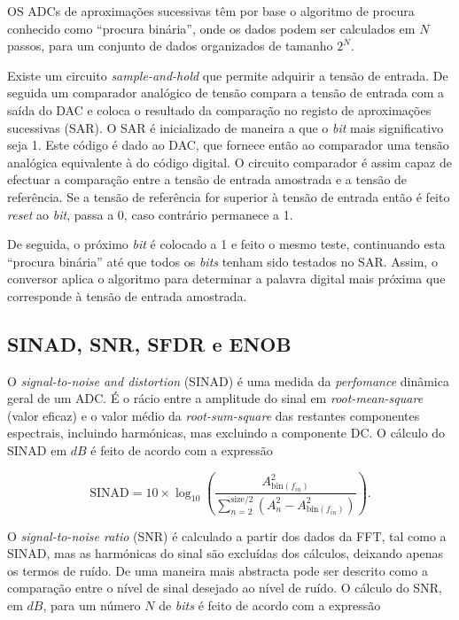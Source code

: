 \documentclass[11pt]{article}
\numberwithin{equation}{section}
\begin{document}
OS ADCs de aproximações sucessivas têm por base o algoritmo de procura conhecido como ``procura binária'', onde os dados podem ser calculados em $N$ passos, para um conjunto de dados organizados de tamanho $2^N$.

Existe um circuito \textit{sample-and-hold} que permite adquirir a tensão de entrada. De seguida um comparador analógico de tensão compara a tensão de entrada com a saída do DAC e coloca o resultado da comparação no registo de aproximações sucessivas (SAR). O SAR é inicializado de maneira a que o \textit{bit} mais significativo seja 1. Este código é dado ao DAC, que fornece então ao comparador uma tensão analógica equivalente à do código digital. O circuito comparador é assim capaz de efectuar a comparação entre a tensão de entrada amostrada e a tensão de referência. Se a tensão de referência for superior à tensão de entrada então é feito \textit{reset} ao \textit{bit}, passa a 0, caso contrário permanece a 1. 

De seguida, o próximo \textit{bit} é colocado a 1 e feito o mesmo teste, continuando esta ``procura binária'' até que todos os \textit{bits} tenham sido testados no SAR. Assim, o conversor aplica o algoritmo para determinar a palavra digital mais próxima que corresponde à tensão de entrada amostrada.

\subsection{SINAD, SNR, SFDR e ENOB}

O \textit{signal-to-noise and distortion} (SINAD) é uma medida da \textit{perfomance} dinâmica geral de um ADC. É o rácio entre a amplitude do sinal em \textit{root-mean-square} (valor eficaz) e o valor médio da \textit{root-sum-square} das restantes componentes espectrais, incluindo harmónicas, mas excluindo a componente DC. O cálculo do SINAD em $dB$ é feito de acordo com a expressão

\vspace{-3mm}
\begin{equation}
\text{SINAD} = 10\times \log_{10} \left(\frac{A^{2}_{\text{bin}(f_{in})}}{\sum_{n=2}^{\text{size}/2}\left(A^{2}_{n} - A^{2}_{\text{bin}(f_{in})}\right)}\right).
\label{eq:SINAD}
\end{equation}

\vspace{1mm}
O \textit{signal-to-noise ratio} (SNR) é calculado a partir dos dados da FFT, tal como a SINAD, mas as harmónicas do sinal são excluídas dos cálculos, deixando apenas os termos de ruído. De uma maneira mais abstracta pode ser descrito como a comparação entre o nível de sinal desejado ao nível de ruído. O cálculo do SNR, em $dB$, para um número $N$ de \textit{bits} é feito de acordo com a expressão
\end{document}
